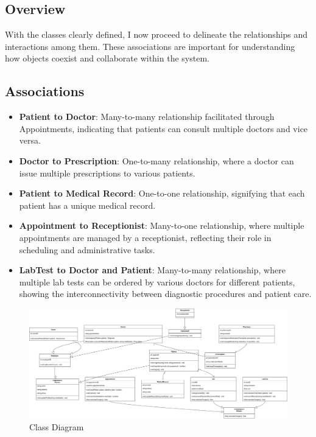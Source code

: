 \documentclass[12pt]{article}
\begin{document}
\subsection*{Overview}
With the classes clearly defined, I now proceed to delineate the relationships and interactions among them. These associations are important for understanding how objects coexist and collaborate within the system.

\subsection*{Associations}
\begin{itemize}
  \item \textbf{Patient to Doctor}: Many-to-many relationship facilitated through Appointments, indicating that patients can consult multiple doctors and vice versa.
  \item \textbf{Doctor to Prescription}: One-to-many relationship, where a doctor can issue multiple prescriptions to various patients.
  \item \textbf{Patient to Medical Record}: One-to-one relationship, signifying that each patient has a unique medical record.
  \item \textbf{Appointment to Receptionist}: Many-to-one relationship, where multiple appointments are managed by a receptionist, reflecting their role in scheduling and administrative tasks.
  \item \textbf{LabTest to Doctor and Patient}: Many-to-many relationship, where multiple lab tests can be ordered by various doctors for different patients, showing the interconnectivity between diagnostic procedures and patient care.
\end{itemize}

\begin{figure}[h!]
\centering
\includegraphics[width=1\textwidth]{1.png}
\caption{Class Diagram}
\end{figure}
\end{document}
